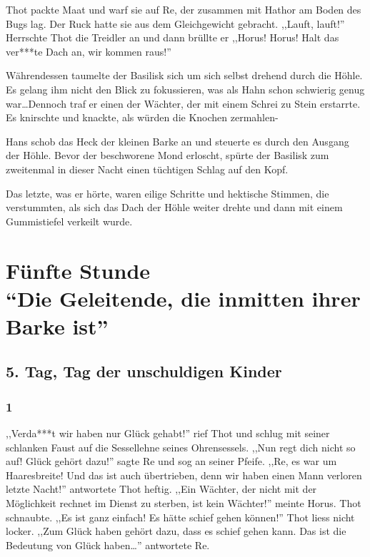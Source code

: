 \documentclass[11pt,titlepage,a5paper]{book}
\begin{document}
Thot packte Maat und warf sie auf Re, der zusammen mit Hathor am Boden des Bugs lag. Der Ruck hatte sie aus dem Gleichgewicht gebracht. ,,Lauft, lauft!'' Herrschte Thot die Treidler an und dann brüllte er ,,Horus! Horus! Halt das ver***te Dach an, wir kommen raus!''

Währendessen taumelte der Basilisk sich um sich selbst drehend durch die Höhle. Es gelang ihm nicht den Blick zu fokussieren, was als Hahn schon schwierig genug war\dots Dennoch traf er einen der Wächter, der mit einem Schrei zu Stein erstarrte. Es knirschte und knackte, als würden die Knochen zermahlen-

Hans schob das Heck der kleinen Barke an und steuerte es durch den Ausgang der Höhle. Bevor der beschworene Mond erloscht, spürte der Basilisk zum zweitenmal in dieser Nacht einen tüchtigen Schlag auf den Kopf. 

Das letzte, was er hörte, waren eilige Schritte und hektische Stimmen, die verstummten, als sich das Dach der Höhle weiter drehte und dann mit einem Gummistiefel verkeilt wurde.


\part*{Fünfte Stunde\\"`Die Geleitende, die inmitten ihrer Barke ist"'}

\chapter*{5. Tag, Tag der unschuldigen Kinder}

\section*{1}

,,Verda***t wir haben nur Glück gehabt!'' rief Thot und schlug mit seiner schlanken Faust auf die Sessellehne seines Ohrensessels. ,,Nun regt dich nicht so auf! Glück gehört dazu!'' sagte Re und sog an seiner Pfeife. ,,Re, es war um Haaresbreite! Und das ist auch übertrieben, denn wir haben einen Mann verloren letzte Nacht!'' antwortete Thot heftig. ,,Ein Wächter, der nicht mit der Möglichkeit rechnet im Dienst zu sterben, ist kein Wächter!'' meinte Horus. Thot schnaubte. ,,Es ist ganz einfach! Es hätte schief gehen können!'' Thot liess nicht locker. ,,Zum Glück haben gehört dazu, dass es schief gehen kann. Das ist die Bedeutung von Glück haben\dots '' antwortete Re.
\end{document}
